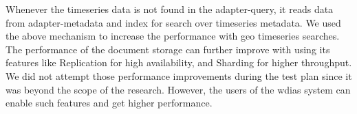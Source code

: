 Whenever the timeseries data is not found in the adapter-query, it reads data from adapter-metadata and index for search over timeseries metadata. We used the above mechanism to increase the performance with geo timeseries searches. The performance of the document storage can further improve with using its features like Replication for high availability, and Sharding for higher throughput.
We did not attempt those performance improvements during the test plan since it was beyond the scope of the research. However, the users of the \acrshort{wdias} system can enable such features and get higher performance.
